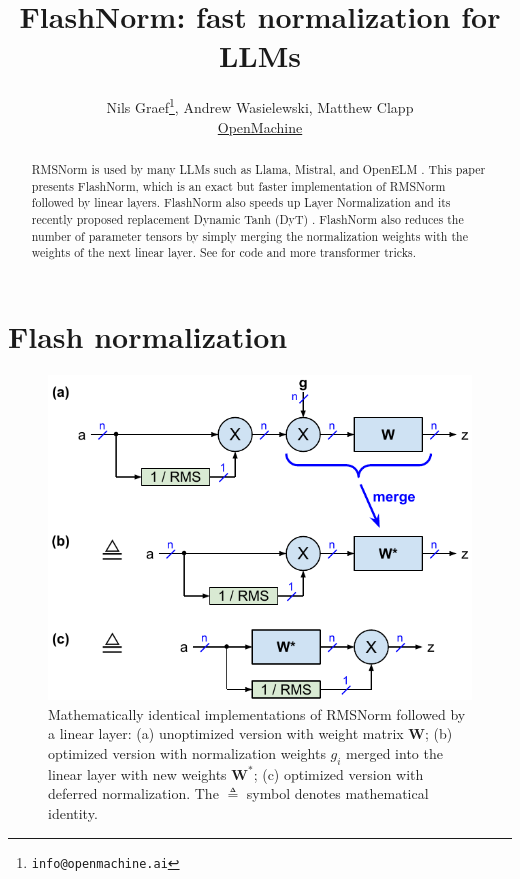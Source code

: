 \documentclass{article}
\title{FlashNorm: fast normalization for LLMs}
\author{Nils Graef\thanks{\texttt{info@openmachine.ai}}, Andrew Wasielewski, Matthew Clapp \\
  \href{https://openmachine.ai}{OpenMachine}}
\newcommand{\mat}[1]{\mathbf{#1}}     %
\def\W*{\mat{W}^\ast}                 %
\begin{document}
 \maketitle

\begin{abstract}
RMSNorm \citep{rms} is used by many LLMs such as Llama, Mistral, and OpenELM \citep{LLaMA, mistral, openelm}.
This paper presents FlashNorm, which is an exact but faster implementation of RMSNorm followed by linear layers. FlashNorm also speeds up Layer Normalization \citep{layerNorm} and its recently proposed replacement Dynamic Tanh (DyT) \citep{DyT}. FlashNorm also reduces the number of parameter tensors by simply merging the normalization weights with the weights of the next linear layer. See \citep{slimAttn, tricks, remove, precompute} for code and more transformer tricks.
\end{abstract}

\section{Flash normalization}
\begin{figure}[h!] \centering  %
  \includegraphics[scale=1.0]{../doc/fig/flashNorm_fig1.pdf}
  \caption{Mathematically identical implementations of RMSNorm followed by a linear layer: (a) unoptimized version with weight matrix $\mat{W}$; (b) optimized version with normalization weights $g_i$ merged into the linear layer with new weights $\W*$; (c) optimized version with deferred normalization. The $\triangleq$ symbol denotes mathematical identity.}
\label{fig1} \end{figure}
\end{document}

